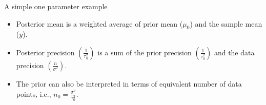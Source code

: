\documentclass[handout]{beamer}
\begin{document}
\begin{frame}{A simple one parameter example}

\vspace{-0.1in}
\begin{footnotesize}
\begin{itemize}
\item Posterior mean is a weighted average of prior mean ($\mu_0$) and the sample mean ($\overline{y}$).
\item Posterior precision $\left(\frac{1}{\tau_n^2}\right)$ is a sum of the prior precision $\left(\frac{1}{\tau_0^2}\right)$ and the data precision $\left(\frac{n}{\sigma^2}\right)$.
\item The prior can also be interpreted in terms of equivalent number of data points, i.e., $n_0 = \frac{\sigma^2}{\tau_0^2}$.
\end{itemize}
\end{footnotesize}
\vspace{-0.5in}

\end{frame}
\end{document}
